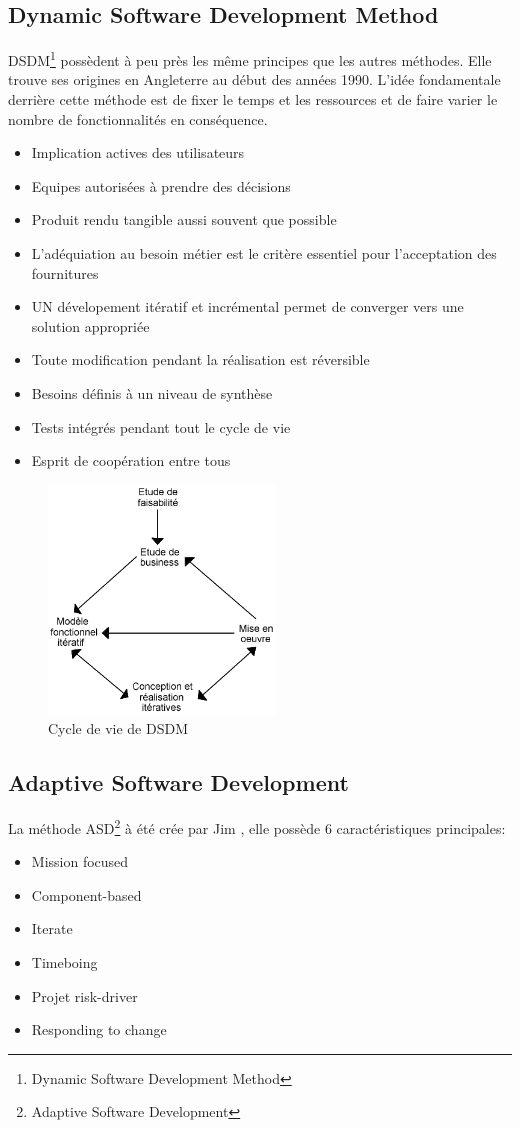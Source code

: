 	\subsection{Dynamic Software Development Method}
	DSDM\footnote{Dynamic Software Development Method} possèdent à peu près les même principes que les autres méthodes. Elle trouve ses origines en Angleterre au début des années 1990. 
	L'idée fondamentale derrière cette méthode est de fixer le temps et les ressources et de faire varier le nombre de fonctionnalités en conséquence.
	\begin{itemize}
		\item Implication actives des utilisateurs
		\item Equipes autorisées à prendre des décisions
		\item Produit rendu tangible aussi souvent que possible
		\item L'adéquiation au besoin métier est le critère essentiel pour l'acceptation des fournitures
		\item UN dévelopement itératif et incrémental permet de converger vers une solution appropriée
		\item Toute modification pendant la réalisation est réversible
		\item Besoins définis à un niveau de synthèse
		\item Tests intégrés pendant tout le cycle de vie
		\item Esprit de coopération entre tous
	\end{itemize}
		\begin{figure}[H]
			\center
			\includegraphics[width=6cm]{images/5-dsdm.png}
			\caption{Cycle de vie de DSDM}
		\end{figure}

	\subsection{Adaptive Software Development}
	La méthode ASD\footnote{Adaptive Software Development} à été crée par Jim , elle possède 6 caractéristiques principales:
	\begin{itemize}
		\item Mission focused
		\item Component-based
		\item Iterate
		\item Timeboing
		\item Projet risk-driver
		\item Responding to change
	\end{itemize}
